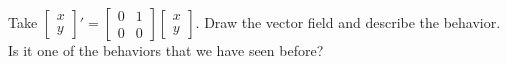\documentclass{ximera}
\begin{document}
\begin{exercise}%
    Take 
    $\left[ 
    \begin{smallmatrix}
        x \\ 
        y 
    \end{smallmatrix}
    \right] '
    = \left[ 
    \begin{smallmatrix} 
        0 & 1 \\ 
        0 & 0
    \end{smallmatrix}
    \right] \left[ 
    \begin{smallmatrix}
        x \\ 
        y 
    \end{smallmatrix}\right]$.
    Draw the vector field and describe the behavior.  Is it one of the behaviors that we have seen before?
\end{exercise}
\end{document}
